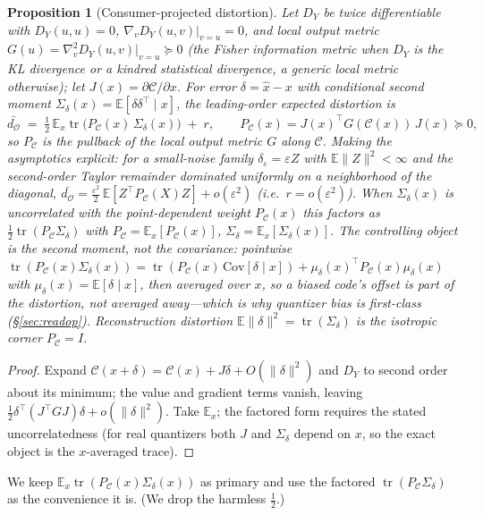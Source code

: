 \documentclass[lettersize,onecolumn]{IEEEtran}
\newtheorem{proposition}{Proposition}
\theoremstyle{definition}
\theoremstyle{remark}
\newcommand{\PC}{P_{\mathcal{C}}}
\newcommand{\Sd}{\Sigma_{\delta}}
\newcommand{\tr}{\operatorname{tr}}
\newcommand{\dO}{d_{\mathcal{O}}}
\newcommand{\E}{\mathbb{E}}
\begin{document}
\begin{proposition}[Consumer-projected distortion]\label{prop:main}
Let $D_Y$ be twice differentiable with $D_Y(u,u)=0$, $\nabla_v D_Y(u,v)|_{v=u}=0$,
and \emph{local output metric} $G(u)=\nabla^2_v D_Y(u,v)|_{v=u}\succeq0$ (the Fisher
information metric when $D_Y$ is the KL divergence or a kindred statistical
divergence, a generic local metric otherwise); let
$J(x)=\partial\mathcal{C}/\partial x$. For error $\delta=\hat x-x$ with conditional
\emph{second moment} $\Sd(x)=\E[\delta\delta^\top\mid x]$, the leading-order expected
distortion is
\[
\bar{\dO} \;=\; \tfrac12\,\E_x\tr\!\big(\PC(x)\,\Sd(x)\big)\;+\;r,
\qquad \PC(x)=J(x)^\top G(\mathcal{C}(x))\,J(x)\succeq0 ,
\]
so $\PC$ is the pullback of the local output metric $G$ along $\mathcal{C}$. Making
the asymptotics explicit: for a small-noise family $\delta_\varepsilon=\varepsilon Z$
with $\E\|Z\|^2<\infty$ and the second-order Taylor remainder dominated uniformly on a
neighborhood of the diagonal, $\bar{\dO}=\tfrac{\varepsilon^2}{2}\,\E[Z^\top\PC(X)Z]
+o(\varepsilon^2)$ (i.e.\ $r=o(\varepsilon^2)$).
When $\Sd(x)$ is uncorrelated with the point-dependent weight $\PC(x)$ this factors
as $\tfrac12\tr(\PC\Sd)$ with $\PC=\E_x[\PC(x)]$, $\Sd=\E_x[\Sd(x)]$. The controlling
object is the \emph{second} moment, not the covariance: pointwise
$\tr(\PC(x)\Sd(x))=\tr(\PC(x)\,\mathrm{Cov}[\delta\mid x])+\mu_\delta(x)^\top\PC(x)
\mu_\delta(x)$ with $\mu_\delta(x)=\E[\delta\mid x]$, then averaged over $x$, so a
biased code's offset is \emph{part} of the distortion, not averaged away---which is
why quantizer bias is first-class (\S\ref{sec:readop}). Reconstruction distortion
$\E\|\delta\|^2=\tr(\Sd)$ is the \emph{isotropic} corner $\PC=I$.
\end{proposition}
\begin{proof}
Expand $\mathcal{C}(x+\delta)=\mathcal{C}(x)+J\delta+O(\|\delta\|^2)$ and $D_Y$ to
second order about its minimum; the value and gradient terms vanish, leaving
$\tfrac12\delta^\top(J^\top GJ)\delta+o(\|\delta\|^2)$. Take $\E_x$; the factored
form requires the stated uncorrelatedness (for real quantizers both $J$ and $\Sd$
depend on $x$, so the exact object is the $x$-averaged trace).
\end{proof}

We keep $\E_x\tr(\PC(x)\Sd(x))$ as primary and use the factored $\tr(\PC\Sd)$ as the
convenience it is. (We drop the harmless $\tfrac12$.)
\end{document}
